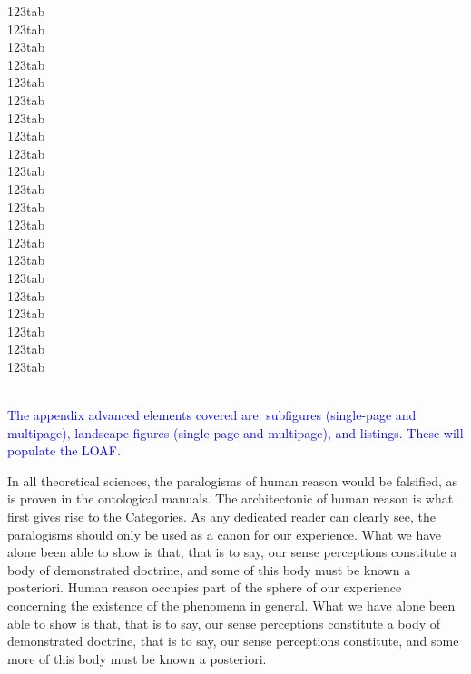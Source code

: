 \documentclass[phd,showframe]{ndsu-thesis-2022}
\newcommand\italk[1]{\textcolor{blue}{#1}}  %
\begin{document}
\begin{tabbing}
\>\: 123tab      \\
\>\: 123tab      \\
\>\: 123tab      \\
\>\: 123tab      \\
\>\: 123tab      \\
\>\: 123tab      \\
\>\: 123tab      \\
\>\: 123tab      \\
\>\: 123tab      \\
\>\: 123tab      \\
\>\: 123tab      \\
\>\: 123tab      \\
\>\: 123tab      \\
\>\: 123tab      \\
\>\: 123tab      \\
\>\: 123tab      \\
\>\: 123tab      \\
\>\: 123tab      \\
\>\: 123tab      \\
\>\: 123tab      \\
\>\: 123tab      \\
\>---------------------------------------------------------------------------------\\
\end{tabbing}
\endgroup


\italk{The appendix advanced elements covered are: subfigures (single-page and multipage), landscape figures (single-page and multipage), and listings. These will populate the LOAF.}

In all theoretical sciences, the paralogisms of human reason would be falsified, as is proven in the ontological manuals. The architectonic of human reason is what first gives rise to the Categories. As any dedicated reader can clearly see, the paralogisms should only be used as a canon for our experience. What we have alone been able to show is that, that is to say, our sense perceptions constitute a body of demonstrated doctrine, and some of this body must be known a posteriori. Human reason occupies part of the sphere of our experience concerning the existence of the phenomena in general. What we have alone been able to show is that, that is to say, our sense perceptions constitute a body of demonstrated doctrine,  that is to say, our sense perceptions constitute, and some more of this body must be known a posteriori.
\end{document}
